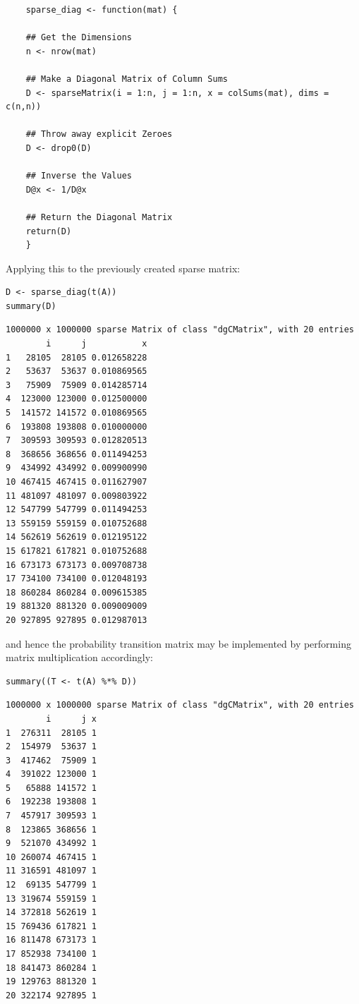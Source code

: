 \documentclass[11pt]{article}
\begin{document}
\begin{listing}[htbp]
    \begin{verbatim}
    sparse_diag <- function(mat) {

    ## Get the Dimensions
    n <- nrow(mat)

    ## Make a Diagonal Matrix of Column Sums
    D <- sparseMatrix(i = 1:n, j = 1:n, x = colSums(mat), dims = c(n,n))

    ## Throw away explicit Zeroes
    D <- drop0(D)

    ## Inverse the Values
    D@x <- 1/D@x

    ## Return the Diagonal Matrix
    return(D)
    }
    \end{verbatim}
\caption{\label{sparse-diag}A function that takes in a column \(\rightarrow\) row adjacency matrix (\(\mathbf{A}\)) and returns a diagonal matrix (\(\mathbf{D}^{-1}_{\mathbf{A}}}\)) such that \(\vec{1}\mathbf{A} \mathbf{D}^{-1}_{\mathbf{A}} = \vec{1}\)}
\end{listing}

Applying this to the previously created sparse matrix:

\begin{verbatim}
D <- sparse_diag(t(A))
summary(D)
\end{verbatim}

\begin{verbatim}
1000000 x 1000000 sparse Matrix of class "dgCMatrix", with 20 entries
        i      j           x
1   28105  28105 0.012658228
2   53637  53637 0.010869565
3   75909  75909 0.014285714
4  123000 123000 0.012500000
5  141572 141572 0.010869565
6  193808 193808 0.010000000
7  309593 309593 0.012820513
8  368656 368656 0.011494253
9  434992 434992 0.009900990
10 467415 467415 0.011627907
11 481097 481097 0.009803922
12 547799 547799 0.011494253
13 559159 559159 0.010752688
14 562619 562619 0.012195122
15 617821 617821 0.010752688
16 673173 673173 0.009708738
17 734100 734100 0.012048193
18 860284 860284 0.009615385
19 881320 881320 0.009009009
20 927895 927895 0.012987013
\end{verbatim}

and hence the probability transition matrix may be implemented by performing matrix multiplication accordingly:

\begin{verbatim}
summary((T <- t(A) %*% D))
\end{verbatim}

\begin{verbatim}
1000000 x 1000000 sparse Matrix of class "dgCMatrix", with 20 entries
        i      j x
1  276311  28105 1
2  154979  53637 1
3  417462  75909 1
4  391022 123000 1
5   65888 141572 1
6  192238 193808 1
7  457917 309593 1
8  123865 368656 1
9  521070 434992 1
10 260074 467415 1
11 316591 481097 1
12  69135 547799 1
13 319674 559159 1
14 372818 562619 1
15 769436 617821 1
16 811478 673173 1
17 852938 734100 1
18 841473 860284 1
19 129763 881320 1
20 322174 927895 1
\end{verbatim}
\end{document}
